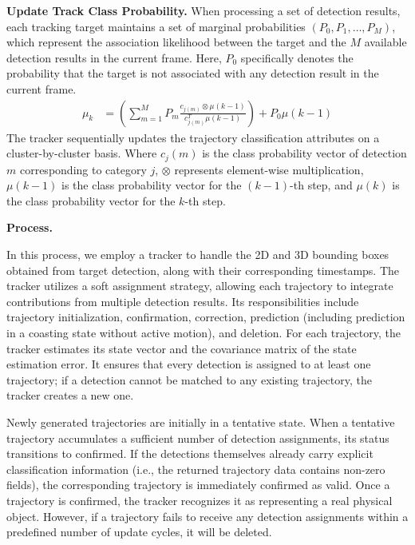 \documentclass[journal,twoside,web]{ieeecolor}
\begin{document}
\textbf{Update Track Class Probability.}
When processing a set of detection results, each tracking target maintains a set of marginal probabilities \(\left(P_{0}, P_{1}, \ldots, P_{M}\right)\), which represent the association likelihood between the target and the \(M\) available detection results in the current frame. Here, \(P_{0}\) specifically denotes the probability that the target is not associated with any detection result in the current frame.
\begin{align}
	\mu_{k} & = \left(\sum_{m = 1}^{M} P_{m} \frac{c_{j(m)} \otimes \mu(k-1)}{c_{j(m)}^{T} \mu(k-1)}\right)+ P_{0} \mu(k-1)
\end{align}
The tracker sequentially updates the trajectory classification attributes on a cluster-by-cluster basis. 
Where \(c_{j}(m)\) is the class probability vector of detection \(m\) corresponding to category \(j\), \(\otimes\) represents element-wise multiplication, \(\mu(k-1)\) is the class probability vector for the \((k-1)\)-th step, and \(\mu(k)\) is the class probability vector for the \(k\)-th step.

\textbf{Process.}

In this process, we employ a tracker to handle the 2D and 3D bounding boxes obtained from target detection, along with their corresponding timestamps. 
The tracker utilizes a soft assignment strategy, allowing each trajectory to integrate contributions from multiple detection results. 
Its responsibilities include trajectory initialization, confirmation, correction, prediction (including prediction in a coasting state without active motion), and deletion. 
For each trajectory, the tracker estimates its state vector and the covariance matrix of the state estimation error. 
It ensures that every detection is assigned to at least one trajectory; if a detection cannot be matched to any existing trajectory, the tracker creates a new one.

Newly generated trajectories are initially in a tentative state. 
When a tentative trajectory accumulates a sufficient number of detection assignments, its status transitions to confirmed. 
If the detections themselves already carry explicit classification information (i.e., the returned trajectory data contains non-zero fields), the corresponding trajectory is immediately confirmed as valid. 
Once a trajectory is confirmed, the tracker recognizes it as representing a real physical object. 
However, if a trajectory fails to receive any detection assignments within a predefined number of update cycles, it will be deleted.
\end{document}
